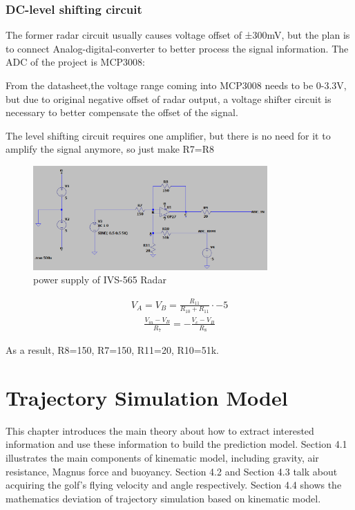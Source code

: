 \subsubsection{DC-level shifting circuit}
The former radar circuit usually causes voltage offset of ±300mV, but the plan is to connect Analog-digital-converter to better process the signal information. The ADC of the project is MCP3008:

From the datasheet\textcite{mcp3008},the voltage range coming into MCP3008 needs to be 0-3.3V, but due to original negative offset of radar output, a voltage shifter circuit is necessary to better compensate the offset of the signal.

The level shifting circuit requires one amplifier, but there is no need for it to amplify the signal anymore, so just make  R7=R8
\begin{figure}[H]
    \centering
    \includegraphics[width=0.8\textwidth]{figure/level shifting circuit.png}
    \caption{power supply of IVS-565 Radar}
    \label{fig:power_radar}
\end{figure}

\begin{align}
V_{A}=V_{B}=\frac{R_{11}}{R_{10}+R_{11}}\cdot-5
\end{align}
\begin{align}
\frac{V_{i n}-V_{B}}{R_{7}}=-\frac{V_{c}-V_{B}}{R_{8}}
\end{align}

As a result, R8=150, R7=150, R11=20, R10=51k.


\newpage
\section{Trajectory Simulation Model}
This chapter introduces the main theory about how to extract interested information and use these information to build the prediction model. Section 4.1 illustrates the main components of kinematic model, including gravity, air resistance, Magnus force and buoyancy. Section 4.2 and Section 4.3 talk about acquiring the golf's flying velocity and angle respectively. Section 4.4 shows the mathematics deviation of trajectory simulation based on kinematic model.
